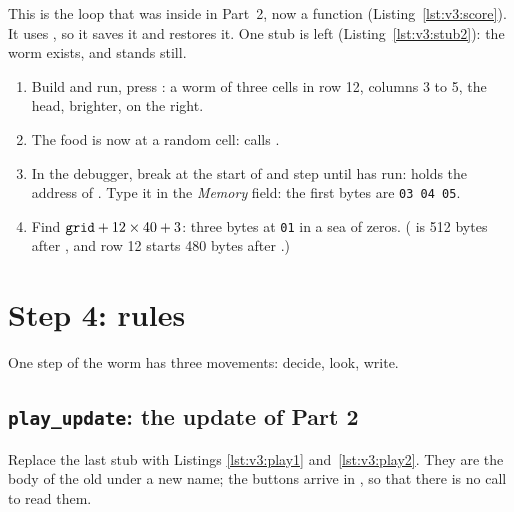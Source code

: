 
This is the loop that was inside  in Part~2, now a function
(Listing~\ref{lst:v3:score}). It uses , so it saves it and restores
it. One stub is left (Listing~\ref{lst:v3:stub2}): the worm exists, and
stands still.


\begin{prgcheck}
\begin{enumerate}[nosep]
\item Build and run, press : a worm of three cells in row 12, columns 3
  to 5, the head, brighter, on the right.
\item The food is now at a random cell:  calls
  .
\item In the debugger, break at the start of  and step until
   has run:  holds the address of
  . Type it in the \emph{Memory} field: the first bytes are
  \texttt{03 04 05}.
\item Find $\texttt{grid}+12\times 40+3$: three bytes at \texttt{01} in a sea of
  zeros. ( is 512 bytes after , and row 12 starts 480
  bytes after .)
\end{enumerate}
\end{prgcheck}

\section{Step 4: rules}

One step of the worm has three movements: decide, look, write.

\subsection{\texttt{play\_update}: the update of Part 2}

Replace the last stub with Listings \ref{lst:v3:play1}
and~\ref{lst:v3:play2}. They are the body of the old 
under a new name; the buttons arrive in , so that there is no call to
read them.



